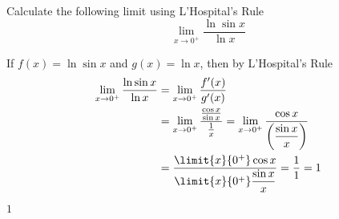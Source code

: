

\question[2] Calculate the following limit using L'Hospital's Rule 
\[ \lim_{x\rightarrow 0^+}\dfrac{\ln\sin x}{\ln x} \]


\ifprintanswers
\fi 

\begin{solution}[\halfpage]
  If $f(x) = \ln\sin x$ and $g(x) = \ln x$, then 
	by L'Hospital's Rule
  \begin{align}
    \lim_{x\to 0^+}\dfrac{\ln\sin x}{\ln x} &= \lim_{x\to 0^+}\dfrac{f'(x)}{g'(x)} \\
    &= \lim_{x\to 0^+}\dfrac{\frac{\cos x}{\sin x}}{\frac{1}{x}}
     = \lim_{x\to 0^+}\dfrac{\cos x}{\left(\dfrac{\sin x}{x}\right)} \\
     &= \dfrac{\limit{x}{0^+}\cos x}{\limit{x}{0^+}\dfrac{\sin x}{x}} = \dfrac{1}{1} = 1
  \end{align}
\end{solution}

\ifprintanswers\begin{codex}$1$\end{codex}\fi

